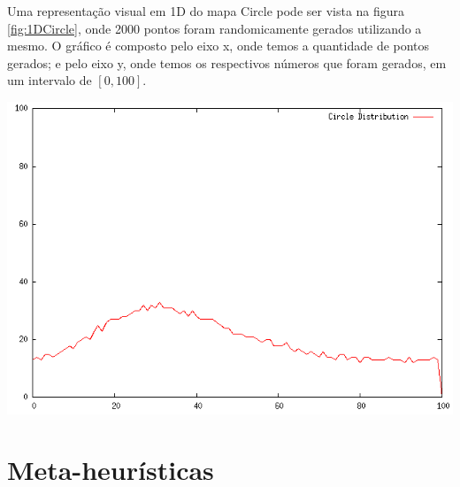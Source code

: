 Uma representação visual em 1D do mapa Circle pode ser vista na figura \ref{fig:1DCircle}, onde 2000 pontos foram randomicamente gerados utilizando a mesmo. O gráfico é composto pelo eixo x, onde temos a quantidade de pontos gerados; e pelo eixo y, onde temos os respectivos números que foram gerados, em um intervalo de $[0, 100]$.

{
    \centering
    \includegraphics[width=0.6\linewidth]{figuras/DistribuicaoCircle.png}
    \label{fig:1DCircle}
}



\section{Meta-heurísticas}


